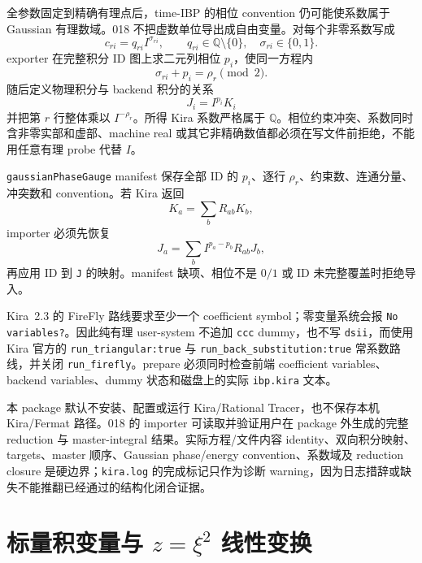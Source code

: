 ﻿\documentclass[a4paper,11pt]{article}
\begin{document}
全参数固定到精确有理点后，time-IBP 的相位 convention 仍可能使系数属于 Gaussian 有理数域。018 不把虚数单位导出成自由变量。对每个非零系数写成
\begin{equation}
  c_{ri}=q_{ri} I^{\sigma_{ri}},\qquad
  q_{ri}\in\mathbb{Q}\setminus\{0\},\quad \sigma_{ri}\in\{0,1\}.
\end{equation}
exporter 在完整积分 ID 图上求二元列相位 $p_i$，使同一方程内
\begin{equation}
  \sigma_{ri}+p_i=\rho_r\pmod 2.
\end{equation}
随后定义物理积分与 backend 积分的关系
\begin{equation}
  J_i=I^{p_i}K_i
\end{equation}
并把第 $r$ 行整体乘以 $I^{-\rho_r}$。所得 Kira 系数严格属于 $\mathbb{Q}$。相位约束冲突、系数同时含非零实部和虚部、machine real 或其它非精确数值都必须在写文件前拒绝，不能用任意有理 probe 代替 $I$。

\texttt{gaussianPhaseGauge} manifest 保存全部 ID 的 $p_i$、逐行 $\rho_r$、约束数、连通分量、冲突数和 convention。若 Kira 返回
\begin{equation}
  K_a=\sum_b R_{ab}K_b,
\end{equation}
importer 必须先恢复
\begin{equation}
  J_a=\sum_b I^{p_a-p_b}R_{ab}J_b,
\end{equation}
再应用 ID 到 \texttt{J} 的映射。manifest 缺项、相位不是 $0/1$ 或 ID 未完整覆盖时拒绝导入。

Kira~2.3 的 FireFly 路线要求至少一个 coefficient symbol；零变量系统会报 \texttt{No variables?}。因此纯有理 user-system 不追加 \texttt{ccc} dummy，也不写 \texttt{dsii}，而使用 Kira 官方的 \texttt{run\_triangular:true} 与 \texttt{run\_back\_substitution:true} 常系数路线，并关闭 \texttt{run\_firefly}。prepare 必须同时检查前端 coefficient variables、backend variables、dummy 状态和磁盘上的实际 \texttt{ibp.kira} 文本。

本 package 默认不安装、配置或运行 Kira/Rational Tracer，也不保存本机 Kira/Fermat 路径。018 的 importer 可读取并验证用户在 package 外生成的完整 reduction 与 master-integral 结果。实际方程/文件内容 identity、双向积分映射、targets、master 顺序、Gaussian phase/energy convention、系数域及 reduction closure 是硬边界；\texttt{kira.log} 的完成标记只作为诊断 warning，因为日志措辞或缺失不能推翻已经通过的结构化闭合证据。

\section{标量积变量与 $z=\xi^2$ 线性变换}
\end{document}
